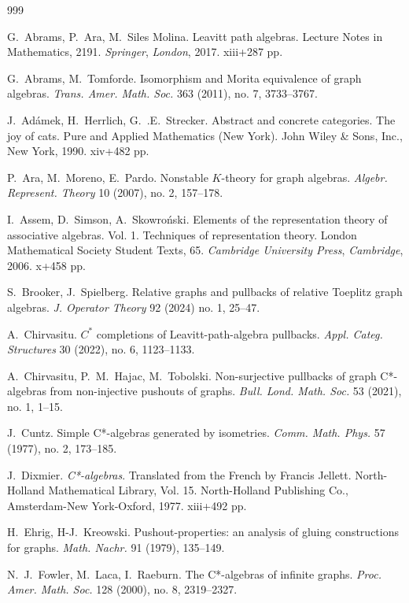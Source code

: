 \documentclass[12pt,times,a4paper]{amsart}
\numberwithin{equation}{section}
\numberwithin{equation}{section}
\begin{document}
\begin{thebibliography}{999}

G.~Abrams, P.~Ara, M.~Siles Molina.
Leavitt path algebras. 
Lecture Notes in Mathematics, 2191. {\em Springer}, {\em London}, 2017. xiii+287 pp.

G.~Abrams, M.~Tomforde. 
Isomorphism and Morita equivalence of graph algebras. 
{\em Trans. Amer. Math. Soc.} 363 (2011), no. 7, 3733--3767.

J.~Ad\'amek, H.~Herrlich, G.~.E.~Strecker. 
Abstract and concrete categories. The joy of cats. 
Pure and Applied Mathematics (New York). 
John Wiley \& Sons, Inc., New York, 1990. {\rm xiv}+482 pp.

P.~Ara, M.~Moreno, E.~Pardo. 
Nonstable $K$-theory for graph algebras. 
{\em Algebr. Represent. Theory} 10 (2007), no. 2, 157--178.

I.~Assem, D.~Simson, A.~Skowro\'nski. 
Elements of the representation theory of associative algebras. Vol. 1. 
Techniques of representation theory. 
London Mathematical Society Student Texts, 65. {\em Cambridge University Press}, {\em Cambridge}, 2006. x+458 pp.

S.~Brooker, J.~Spielberg.
Relative graphs and pullbacks of relative Toeplitz graph algebras. 
\emph{J. Operator Theory} 92 (2024) no. 1, 25--47.

A.~Chirvasitu. 
$C^*$ completions of Leavitt-path-algebra pullbacks. 
{\em Appl. Categ. Structures} 30 (2022), no. 6, 1123--1133.

A.~Chirvasitu, P.~M.~Hajac, M.~Tobolski.
Non-surjective pullbacks of graph C*-algebras from non-injective pushouts of graphs. 
{\em Bull. Lond. Math. Soc.} 53 (2021), no. 1, 1--15.

J.~Cuntz.
Simple C*-algebras generated by isometries. 
{\em Comm. Math. Phys.} 57 (1977), no. 2, 173--185.

J.~Dixmier. 
{\em C*-algebras}. 
Translated from the French by Francis Jellett. 
North-Holland Mathematical Library, Vol. 15. 
North-Holland Publishing Co., Amsterdam-New York-Oxford, 1977. {\rm xiii}+492 pp.

H.~Ehrig, H-J.~Kreowski. 
Pushout-properties: an analysis of gluing constructions for graphs. 
{\em Math. Nachr.} 91 (1979), 135--149.

N.~J.~Fowler, M.~Laca, I.~Raeburn. 
The C*-algebras of infinite graphs. 
{\em Proc. Amer. Math. Soc.} 128 (2000), no. 8, 2319--2327.


\end{thebibliography}
\end{document}
